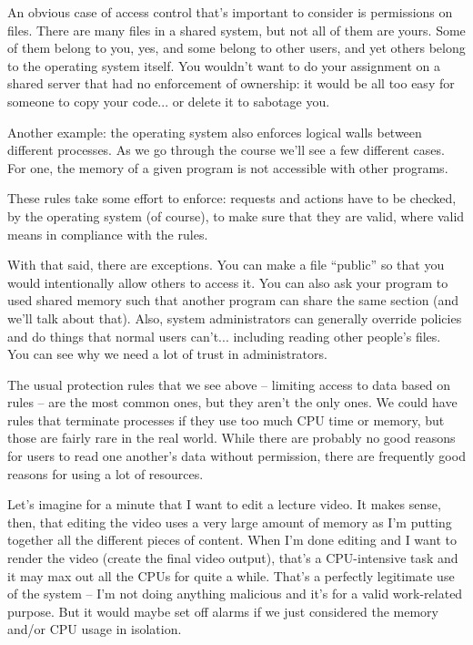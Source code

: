 An obvious case of access control that's important to consider is permissions on files. There are many files in a shared system, but not all of them are yours. Some of them belong to you, yes, and some belong to other users, and yet others belong to the operating system itself. You wouldn't want to do your assignment on a shared server that had no enforcement of ownership: it would be all too easy for someone to copy your code... or delete it to sabotage you. 

Another example: the operating system also enforces logical walls between different processes. As we go through the course we'll see a few different cases. For one, the memory of a given program is not accessible with other programs.

These rules take some effort to enforce: requests and actions have to be checked, by the operating system (of course), to make sure that they are valid, where valid means in compliance with the rules.

With that said, there are exceptions. You can make a file ``public'' so that you would intentionally allow others to access it. You can also ask your program to used shared memory such that another program can share the same section (and we'll talk about that). Also, system administrators can generally override policies and do things that normal users can't... including reading other people's files. You can see why we need a lot of trust in administrators.

The usual protection rules that we see above -- limiting access to data based on rules -- are the most common ones, but they aren't the only ones. We could have rules that terminate processes if they use too much CPU time or memory, but those are fairly rare in the real world. While there are probably no good reasons for users to read one another's data without permission, there are frequently good reasons for using a lot of resources. 

Let's imagine for a minute that I want to edit a lecture video. It makes sense, then, that editing the video uses a very large amount of memory as I'm putting together all the different pieces of content. When I'm done editing and I want to render the video (create the final video output), that's a CPU-intensive task and it may max out all the CPUs for quite a while. That's a perfectly legitimate use of the system -- I'm not doing anything malicious and it's for a valid work-related purpose. But it would maybe set off alarms if we just considered the memory and/or CPU usage in isolation.

